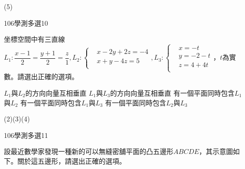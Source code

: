 \begin{QUESTIONS}
\begin{QUESTION}
        \begin{QTAGS}
        \end{QTAGS}
        \begin{QANS}
            (5)
        \end{QANS}
        \begin{QSOL}
        \end{QSOL}
        \begin{QEMPTYSPACE}
        \end{QEMPTYSPACE}
    \end{QUESTION}
    \begin{QUESTION}
        \begin{ExamInfo}{106}{學測}{多選}{10}
        \end{ExamInfo}
        \begin{QBODY}
            坐標空間中有三直線${{L}_{1}}:\dfrac{x-1}{2}=\dfrac{y+1}{2}=\dfrac{z}{1},{{L}_{2}}:\left\{ \begin{aligned}
        & x-2y+2z=-4 \\ 
        & x+y-4z=5 \\ 
        \end{aligned} \right.,{{L}_{3}}:\left\{ \begin{aligned}
        & x=-t \\ 
        & y=-2-t \\ 
        & z=4+4t \\ 
        \end{aligned} \right.$，$t$為實數。請選出正確的選項。
        \begin{QOPS}
            \QOP ${{L}_{1}}$與${{L}_{2}}$的方向向量互相垂直
            \QOP ${{L}_{1}}$與${{L}_{3}}$的方向向量互相垂直
            \QOP 有一個平面同時包含${{L}_{1}}$與${{L}_{2}}$
            \QOP 有一個平面同時包含${{L}_{1}}$與${{L}_{3}}$
            \QOP 有一個平面同時包含${{L}_{2}}$與${{L}_{3}}$
        \end{QOPS}
        \end{QBODY}
        \begin{QFROMS}
        \end{QFROMS}
        \begin{QTAGS}
        \end{QTAGS}
        \begin{QANS}
            (2)(3)(4)
        \end{QANS}
        \begin{QSOL}
        \end{QSOL}
        \begin{QEMPTYSPACE}
        \end{QEMPTYSPACE}
    \end{QUESTION}
    \begin{QUESTION}
        \begin{ExamInfo}{106}{學測}{多選}{11}
        \end{ExamInfo}
        \begin{QBODY}
            設最近數學家發現一種新的可以無縫密舖平面的凸五邊形$ABCDE$，其示意圖如下。關於這五邊形，請選出正確的選項。
        

\end{QBODY}
\end{QUESTION}
\end{QUESTIONS}

